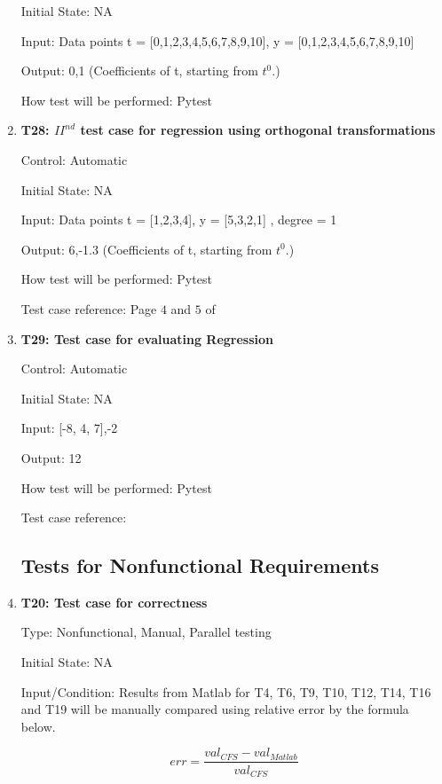 \documentclass[12pt, titlepage]{article}
\begin{document}
\begin{enumerate}
Initial State: NA

Input: Data points t = [0,1,2,3,4,5,6,7,8,9,10], y = [0,1,2,3,4,5,6,7,8,9,10] 

Output: 0,1 (Coefficients of t, starting from $t^{0}$.)

How test will be performed: Pytest\\


\item{\textbf{T28: ${II}^{nd}$ test case for regression using orthogonal 
transformations}\\}

Control: Automatic

Initial State: NA

Input: Data points t = [1,2,3,4], y = [5,3,2,1] , degree = 1

Output: 6,-1.3 (Coefficients of t, starting from $t^{0}$.)

How test will be performed: Pytest

Test case reference: Page $4$ and $5$ of \cite{RegOrthogonal}\\

\item{\textbf{T29: Test case for evaluating Regression}}

Control: Automatic

Initial State: NA

Input: [-8, 4, 7],-2

Output: 12

How test will be performed: Pytest

Test case reference: \cite{RegAugmented}\\



\subsection{Tests for Nonfunctional Requirements}\label{NFRTesting}



\item{\textbf{T20: Test case for correctness}\\}

Type: Nonfunctional, Manual, Parallel testing
					
Initial State: NA
					
Input/Condition: Results from Matlab for T4, T6, T9, T10, T12, T14, T16 and T19 will be manually compared using relative error by the formula below.

\begin{equation*}
err = \frac{val_{CFS} - val_{Matlab}}{val_{CFS}}
\end{equation*}


\end{enumerate}
\end{document}
